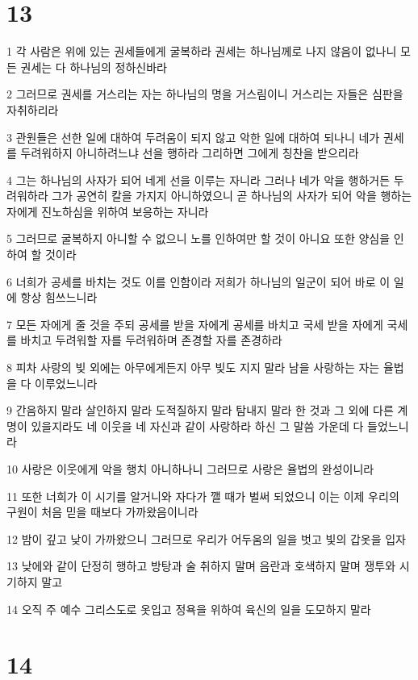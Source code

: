 \chapter{13}

\par 1 각 사람은 위에 있는 권세들에게 굴복하라 권세는 하나님께로 나지 않음이 없나니 모든 권세는 다 하나님의 정하신바라
\par 2 그러므로 권세를 거스리는 자는 하나님의 명을 거스림이니 거스리는 자들은 심판을 자취하리라
\par 3 관원들은 선한 일에 대하여 두려움이 되지 않고 악한 일에 대하여 되나니 네가 권세를 두려워하지 아니하려느냐 선을 행하라 그리하면 그에게 칭찬을 받으리라
\par 4 그는 하나님의 사자가 되어 네게 선을 이루는 자니라 그러나 네가 악을 행하거든 두려워하라 그가 공연히 칼을 가지지 아니하였으니 곧 하나님의 사자가 되어 악을 행하는 자에게 진노하심을 위하여 보응하는 자니라
\par 5 그러므로 굴복하지 아니할 수 없으니 노를 인하여만 할 것이 아니요 또한 양심을 인하여 할 것이라
\par 6 너희가 공세를 바치는 것도 이를 인함이라 저희가 하나님의 일군이 되어 바로 이 일에 항상 힘쓰느니라
\par 7 모든 자에게 줄 것을 주되 공세를 받을 자에게 공세를 바치고 국세 받을 자에게 국세를 바치고 두려워할 자를 두려워하며 존경할 자를 존경하라
\par 8 피차 사랑의 빚 외에는 아무에게든지 아무 빚도 지지 말라 남을 사랑하는 자는 율법을 다 이루었느니라
\par 9 간음하지 말라 살인하지 말라 도적질하지 말라 탐내지 말라 한 것과 그 외에 다른 계명이 있을지라도 네 이웃을 네 자신과 같이 사랑하라 하신 그 말씀 가운데 다 들었느니라
\par 10 사랑은 이웃에게 악을 행치 아니하나니 그러므로 사랑은 율법의 완성이니라
\par 11 또한 너희가 이 시기를 알거니와 자다가 깰 때가 벌써 되었으니 이는 이제 우리의 구원이 처음 믿을 때보다 가까왔음이니라
\par 12 밤이 깊고 낮이 가까왔으니 그러므로 우리가 어두움의 일을 벗고 빛의 갑옷을 입자
\par 13 낮에와 같이 단정히 행하고 방탕과 술 취하지 말며 음란과 호색하지 말며 쟁투와 시기하지 말고
\par 14 오직 주 예수 그리스도로 옷입고 정욕을 위하여 육신의 일을 도모하지 말라

\chapter{14}

